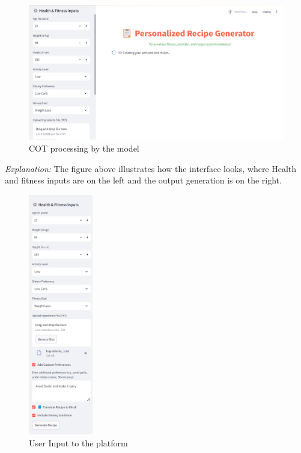 \documentclass[letterpaper,11pt]{report}
\begin{document}
\begin{figure}[h]
    \centering
    \includegraphics[width=\linewidth]{image.png}
    \caption{COT processing by the model}
    \label{fig:Thought Process}
\end{figure}
\noindent
\textit{Explanation:} The figure above illustrates how the interface looks, where Health and fitness inputs are on the left and the output generation is on the right.

\newpage
\begin{figure}[h]
    \centering
    \includegraphics[width=0.25\textwidth]{User Inputs.png}
    \caption{User Input to the platform}
    \label{fig:User Input}
\end{figure}
\end{document}
